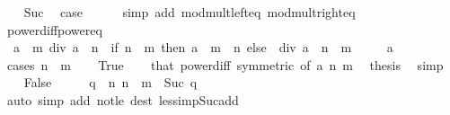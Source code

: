 \begin{isabellebody}
\ \ \isamarkupfalse%
\ Suc\ \isamarkupfalse%
\ {\isacharquery}{\kern0pt}case\isanewline
\ \ \ \ \isamarkupfalse%
\ {\isacharparenleft}{\kern0pt}simp\ add{\isacharcolon}{\kern0pt}\ mod{\isacharunderscore}{\kern0pt}mult{\isacharunderscore}{\kern0pt}left{\isacharunderscore}{\kern0pt}eq\ mod{\isacharunderscore}{\kern0pt}mult{\isacharunderscore}{\kern0pt}right{\isacharunderscore}{\kern0pt}eq{\isacharparenright}{\kern0pt}\isanewline
{}\isamarkupfalse%
%
\endisatagproof
{\isafoldproof}%
%
\isadelimproof
\isanewline
%
\endisadelimproof
\isanewline
{}\isamarkupfalse%
\ power{\isacharunderscore}{\kern0pt}diff{\isacharunderscore}{\kern0pt}power{\isacharunderscore}{\kern0pt}eq{\isacharcolon}{\kern0pt}\isanewline
\ \ {\isacartoucheopen}a\ {\isacharcircum}{\kern0pt}\ m\ div\ a\ {\isacharcircum}{\kern0pt}\ n\ {\isacharequal}{\kern0pt}\ {\isacharparenleft}{\kern0pt}if\ n\ {\isasymle}\ m\ then\ a\ {\isacharcircum}{\kern0pt}\ {\isacharparenleft}{\kern0pt}m\ {\isacharminus}{\kern0pt}\ n{\isacharparenright}{\kern0pt}\ else\ {}\ div\ a\ {\isacharcircum}{\kern0pt}\ {\isacharparenleft}{\kern0pt}n\ {\isacharminus}{\kern0pt}\ m{\isacharparenright}{\kern0pt}{\isacharparenright}{\kern0pt}{\isacartoucheclose}\isanewline
\ \ \ \ \ {\isacartoucheopen}a\ {\isasymnoteq}\ {}{\isacartoucheclose}\isanewline
%
\isadelimproof
%
\endisadelimproof
%
\isatagproof
{}\isamarkupfalse%
\ {\isacharparenleft}{\kern0pt}cases\ {\isacartoucheopen}n\ {\isasymle}\ m{\isacartoucheclose}{\isacharparenright}{\kern0pt}\isanewline
\ \ \isamarkupfalse%
\ True\isanewline
\ \ \isamarkupfalse%
\ that\ power{\isacharunderscore}{\kern0pt}diff\ {\isacharbrackleft}{\kern0pt}symmetric{\isacharcomma}{\kern0pt}\ of\ a\ n\ m{\isacharbrackright}{\kern0pt}\ \isamarkupfalse%
\ {\isacharquery}{\kern0pt}thesis\ \isamarkupfalse%
\ simp\isanewline
{}\isamarkupfalse%
\isanewline
\ \ \isamarkupfalse%
\ False\isanewline
\ \ \isamarkupfalse%
\ \isamarkupfalse%
\ q\ \ n{\isacharcolon}{\kern0pt}\ {\isacartoucheopen}n\ {\isacharequal}{\kern0pt}\ m\ {\isacharplus}{\kern0pt}\ Suc\ q{\isacartoucheclose}\isanewline
\ \ \ \ \isamarkupfalse%
\ {\isacharparenleft}{\kern0pt}auto\ simp\ add{\isacharcolon}{\kern0pt}\ not{\isacharunderscore}{\kern0pt}le\ dest{\isacharcolon}{\kern0pt}\ less{\isacharunderscore}{\kern0pt}imp{\isacharunderscore}{\kern0pt}Suc{\isacharunderscore}{\kern0pt}add{\isacharparenright}{\kern0pt}\isanewline

\end{isabellebody}
